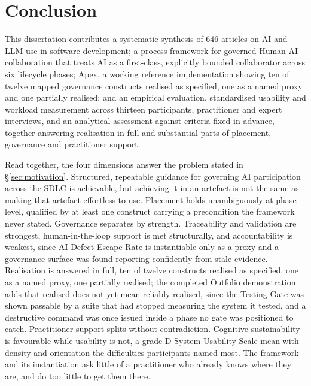\documentclass[sigconf,review=false]{acmart}
\begin{document}
\section{Conclusion}
\label{sec:conclusion}

This dissertation contributes a systematic synthesis of 646 articles on AI and LLM use in software development; a process framework for governed Human-AI collaboration that treats AI as a first-class, explicitly bounded collaborator across six lifecycle phases; Apex, a working reference implementation showing ten of twelve mapped governance constructs realised as specified, one as a named proxy and one partially realised; and an empirical evaluation, standardised usability and workload measurement across thirteen participants, practitioner and expert interviews, and an analytical assessment against criteria fixed in advance, together answering realisation in full and substantial parts of placement, governance and practitioner support.

Read together, the four dimensions answer the problem stated in \S\ref{sec:motivation}. Structured, repeatable guidance for governing AI participation across the SDLC is achievable, but achieving it in an artefact is not the same as making that artefact effortless to use. Placement holds unambiguously at phase level, qualified by at least one construct carrying a precondition the framework never stated. Governance separates by strength. Traceability and validation are strongest, human-in-the-loop support is met structurally, and accountability is weakest, since AI Defect Escape Rate is instantiable only as a proxy and a governance surface was found reporting confidently from stale evidence. Realisation is answered in full, ten of twelve constructs realised as specified, one as a named proxy, one partially realised; the completed Outfolio demonstration adds that realised does not yet mean reliably realised, since the Testing Gate was shown passable by a suite that had stopped measuring the system it tested, and a destructive command was once issued inside a phase no gate was positioned to catch. Practitioner support splits without contradiction. Cognitive sustainability is favourable while usability is not, a grade D System Usability Scale mean with density and orientation the difficulties participants named most. The framework and its instantiation ask little of a practitioner who already knows where they are, and do too little to get them there.
\end{document}
